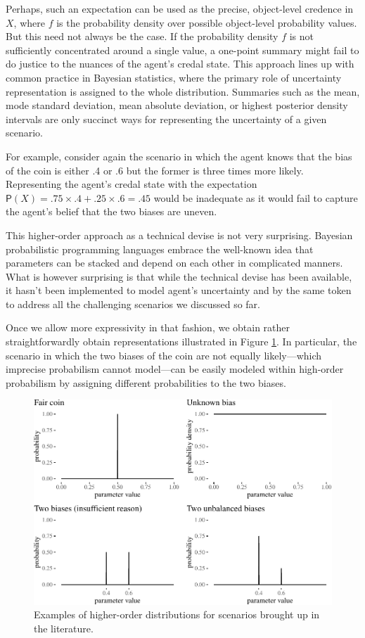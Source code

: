 \documentclass[
  10pt,
  dvipsnames,enabledeprecatedfontcommands]{scrartcl}
\begin{document}
Perhaps, such an expectation can be used as the precise, object-level
credence in \(X\), where \(f\) is the probability density over possible
object-level probability values. But this need not always be the case.
If the probability density \(f\) is not sufficiently concentrated around
a single value, a one-point summary might fail to do justice to the
nuances of the agent's credal state. This approach lines up with common
practice in Bayesian statistics, where the primary role of uncertainty
representation is assigned to the whole distribution. Summaries such as
the mean, mode standard deviation, mean absolute deviation, or highest
posterior density intervals are only succinct ways for representing the
uncertainty of a given scenario.

For example, consider again the scenario in which the agent knows that
the bias of the coin is either .4 or .6 but the former is three times
more likely. Representing the agent's credal state with the expectation
\(\mathsf{P}(X) = .75 \times .4 + .25 \times .6 = .45\) would be
inadequate as it would fail to capture the agent's belief that the two
biases are uneven.

This higher-order approach as a technical devise is not very surprising.
Bayesian probabilistic programming languages embrace the well-known idea
that parameters can be stacked and depend on each other in complicated
manners. What is however surprising is
that while the technical devise has been available, it hasn't been
implemented to model agent's uncertainty and by the same token to
address all the challenging scenarios we discussed so far.

Once we allow more expressivity in that fashion, we obtain rather
straightforwardly obtain representations illustrated in Figure
\ref{fig:evidenceResponse}. In particular, the scenario in which the two
biases of the coin are not equally likely---which imprecise probabilism
cannot model---can be easily modeled within high-order probabilism by
assigning different probabilities to the two biases.

\begin{figure}[t]

\begin{center}\includegraphics[width=0.8\linewidth]{imprecision_philosophical_paper._files/figure-latex/fig:evidenceResponse2-1} \end{center}
\caption{Examples of higher-order distributions for scenarios brought up in the literature.}
\label{fig:evidenceResponse}
\end{figure}
\end{document}
